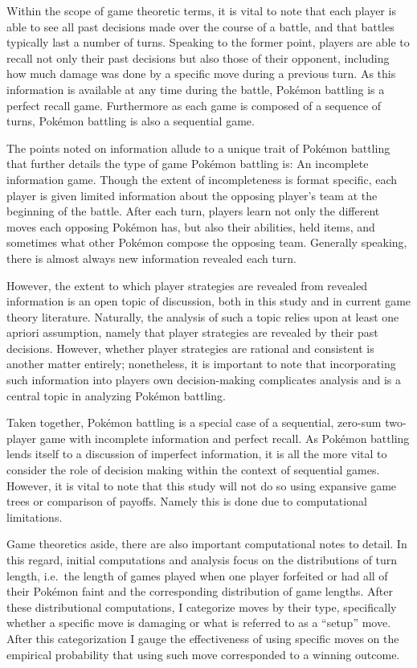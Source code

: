 \documentclass[12pt,twoside]{reedthesis}
\begin{document}
  Within the scope of game theoretic terms, it is vital to note that each
  player is able to see all past decisions made over the course of a
  battle, and that battles typically last a number of turns. Speaking to
  the former point, players are able to recall not only their past
  decisions but also those of their opponent, including how much damage
  was done by a specific move during a previous turn. As this information
  is available at any time during the battle, Pokémon battling is a
  perfect recall game. Furthermore as each game is composed of a sequence
  of turns, Pokémon battling is also a sequential game.
  
  The points noted on information allude to a unique trait of Pokémon
  battling that further details the type of game Pokémon battling is: An
  incomplete information game. Though the extent of incompleteness is
  format specific, each player is given limited information about the
  opposing player's team at the beginning of the battle. After each turn,
  players learn not only the different moves each opposing Pokémon has,
  but also their abilities, held items, and sometimes what other Pokémon
  compose the opposing team. Generally speaking, there is almost always
  new information revealed each turn.
  
  However, the extent to which player strategies are revealed from
  revealed information is an open topic of discussion, both in this study
  and in current game theory literature. Naturally, the analysis of such a
  topic relies upon at least one apriori assumption, namely that player
  strategies are revealed by their past decisions. However, whether player
  strategies are rational and consistent is another matter entirely;
  nonetheless, it is important to note that incorporating such information
  into players own decision-making complicates analysis and is a central
  topic in analyzing Pokémon battling.
  
  Taken together, Pokémon battling is a special case of a sequential,
  zero-sum two-player game with incomplete information and perfect recall.
  As Pokémon battling lends itself to a discussion of imperfect
  information, it is all the more vital to consider the role of decision
  making within the context of sequential games. However, it is vital to
  note that this study will not do so using expansive game trees or
  comparison of payoffs. Namely this is done due to computational
  limitations.
  
  Game theoretics aside, there are also important computational notes to
  detail. In this regard, initial computations and analysis focus on the
  distributions of turn length, i.e.~the length of games played when one
  player forfeited or had all of their Pokémon faint and the corresponding
  distribution of game lengths. After these distributional computations, I
  categorize moves by their type, specifically whether a specific move is
  damaging or what is referred to as a ``setup'' move. After this
  categorization I gauge the effectiveness of using specific moves on the
  empirical probability that using such move corresponded to a winning
  outcome.
  
\end{document}
